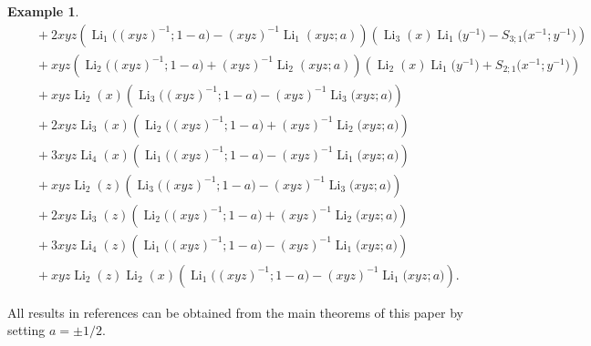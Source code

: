 \documentclass[11pt]{article}
\DeclareMathOperator{\Li}{Li}
\theoremstyle{plain}
\theoremstyle{definition}
\newtheorem{exa}[thm]{Example}
\begin{document}
\begin{exa}
\begin{align*}
	&\quad+2xyz\left(\Li_{1}\Big((xyz)^{-1};1-a\Big)-(xyz)^{-1} \Li_{1}(xyz;a)\right)\left(\Li_{3}(x)\Li_{1}\Big(y^{-1}\Big)-S_{3;1}\Big(x^{-1};y^{-1}\Big)\right)\nonumber\\
	&\quad+xyz\left(\Li_{2}\Big((xyz)^{-1};1-a\Big)+(xyz)^{-1} \Li_{2}(xyz;a)\right)\left(\Li_{2}(x)\Li_{1}\Big(y^{-1}\Big)+S_{2;1}\Big(x^{-1};y^{-1}\Big)\right)\\
	&\quad+xyz\Li_{2}(x)\left(\Li_{3}\Big((xyz)^{-1};1-a\Big)-(xyz)^{-1} \Li_{3}\Big(xyz;a\Big)\right)\\
	&\quad+2xyz\Li_{3}(x)\left(\Li_{2}\Big((xyz)^{-1};1-a\Big)+(xyz)^{-1}\Li_{2}\Big(xyz;a\Big)\right)\nonumber\\
	&\quad+3xyz\Li_{4}(x)\left(\Li_{1}\Big((xyz)^{-1};1-a\Big)-(xyz)^{-1}\Li_{1}\Big(xyz;a\Big)\right)\\
    &\quad+xyz\Li_{2}(z)\left(\Li_{3}\Big((xyz)^{-1};1-a\Big)-(xyz)^{-1} \Li_{3}\Big(xyz;a\Big)\right)\\
    &\quad+2xyz\Li_{3}(z)\left(\Li_{2}\Big((xyz)^{-1};1-a\Big)+(xyz)^{-1}\Li_{2}\Big(xyz;a\Big)\right)\nonumber\\
    &\quad+3xyz\Li_{4}(z)\left(\Li_{1}\Big((xyz)^{-1};1-a\Big)-(xyz)^{-1}\Li_{1}\Big(xyz;a\Big)\right)\\
	&\quad+xyz\Li_{2}(z)\Li_2(x)\left(\Li_{1}\Big((xyz)^{-1};1-a\Big)-(xyz)^{-1}\Li_{1}\Big(xyz;a\Big)\right).
\end{align*}
\end{exa}

All results in references \cite{Wang-Xu2025,XC2025} can be obtained from the main theorems of this paper by setting $a=\pm 1/2$.
\end{document}
